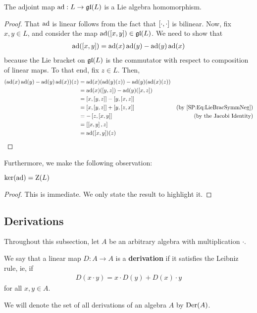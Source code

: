 \begin{boxproposition}\label{Ch1:Prop:AdjointLieAlgHom}
    The adjoint map $\operatorname{ad} : L \to \mathfrak{gl}\!\left( L \right)$ is a Lie algebra homomorphism.
\end{boxproposition}
\begin{proof}
    That $\operatorname{ad}$ is linear follows from the fact that $\left[ \cdot, \cdot \right]$ is bilinear. Now, fix $x, y \in L$, and consider the map $\operatorname{ad}\!\left( \left[ x, y \right] \right) \in \mathfrak{gl}\!\left( L \right)$. We need to show that
    \begin{align*}
        \operatorname{ad}\!\left( \left[ x, y \right] \right) = \operatorname{ad}\!\left( x \right)\operatorname{ad}\!\left( y \right) - \operatorname{ad}\!\left( y \right)\operatorname{ad}\!\left( x \right)
    \end{align*}
    because the Lie bracket on $\mathfrak{gl}\!\left( L \right)$ is the commutator with respect to composition of linear maps. To that end, fix $z \in L$. Then,
    \begin{align*}
        \parenth{\pad{x}\pad{y} - \pad{y}\pad{x}}\!(z)
        &= \pad{x}\!\parenth{\pad{y}\!(z)} - \pad{y}\!\parenth{\pad{x}\!(z)} & \\
        &= \pad{x}\!\parenth{\brac{y, z}} - \pad{y}\!\parenth{\brac{x, z}} & \\
        &= \brac{x, \brac{y, z}} - \brac{y, \brac{x, z}} & \\
        &= \brac{x, \brac{y, z}} + \brac{y, \brac{z, x}} & \text{(by \eqref{SP:Eq:LieBracSymmNeg})} \\
        &= - \brac{z, \brac{x, y}} & \text{(by the Jacobi Identity)} \\
        &= \brac{\brac{x, y}, z} \\
        &= \pad{\brac{x, y}}\!(z)
    \end{align*}
\end{proof}

Furthermore, we make the following observation:
\begin{boxlemma}
    $\operatorname{ker}\!\left( \operatorname{ad} \right) = \operatorname{Z}\!\left( L \right)$
\end{boxlemma}
\begin{proof}
    This is immediate. We only state the result to highlight it.
\end{proof}

\subsection{Derivations}

Throughout this subsection, let $A$ be an arbitrary algebra with multiplication $\cdot$.

\begin{boxdefinition}\label{Ch1:Def:Derivation}
    We say that a linear map $D : A \to A$ is a \textbf{derivation} if it satisfies the Leibniz rule, ie, if
    \begin{align}
        D(x \cdot y) = x \cdot D(y) + D(x) \cdot y
        \label{Ch1:Eq:LeibnizRule}
    \end{align}
    for all $x, y \in A$.
\end{boxdefinition}
\begin{boxconvention}
    We will denote the set of all derivations of an algebra $A$ by $\operatorname{Der}\!\left( A \right)$.
\end{boxconvention}

